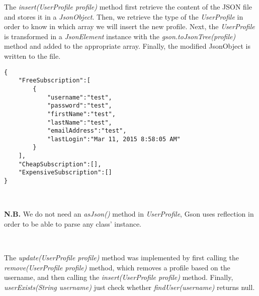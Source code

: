 The \emph{insert(UserProfile profile)} method first retrieve the content
of the JSON file and stores it in a \emph{JsonObject}. Then, we retrieve
the type of the \emph{UserProfile} in order to know in which array we
will insert the new profile. Next, the \emph{UserProfile} is transformed
in a \emph{JsonElement} instance with the
\emph{gson.toJsonTree(profile)} method and added to the appropriate
array. Finally, the modified JsonObject is written to the file.\\

\begin{lstlisting}[caption={FreeSubscription profile added}]
{
    "FreeSubscription":[
        {
            "username":"test",
            "password":"test",
            "firstName":"test",
            "lastName":"test",
            "emailAddress":"test",
            "lastLogin":"Mar 11, 2015 8:58:05 AM"
        }
    ],
    "CheapSubscription":[],
    "ExpensiveSubscription":[]
}
\end{lstlisting}
\

\begin{framehint}
\textbf{N.B.} We do not need an \emph{asJson()} method in \emph{UserProfile},
Gson uses reflection in order to be able to parse any class' instance.
\end{framehint}
\

The \emph{update(UserProfile profile)} method was implemented by first
calling the \emph{remove(UserProfile profile)} method, which removes a
profile based on the username, and then calling the
\emph{insert(UserProfile profile)} method.
Finally, \emph{userExists(String username)} just check whether
\emph{findUser(username)} returns null.\\

